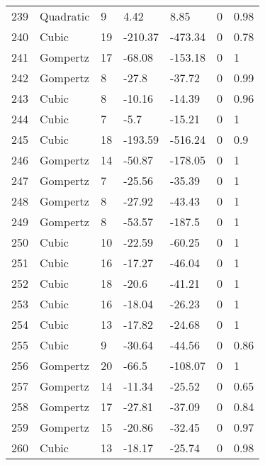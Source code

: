 \documentclass[11pt]{article}
\begin{document}
\begin{center}
\begin{longtable}{lllllll}
        239 & Quadratic & 9               & 4.42    & 8.85    & 0       & 0.98 \\
        240 & Cubic     & 19              & -210.37 & -473.34 & 0       & 0.78 \\
        241 & Gompertz  & 17              & -68.08  & -153.18 & 0       & 1    \\
        242 & Gompertz  & 8               & -27.8   & -37.72  & 0       & 0.99 \\
        243 & Cubic     & 8               & -10.16  & -14.39  & 0       & 0.96 \\
        244 & Cubic     & 7               & -5.7    & -15.21  & 0       & 1    \\
        245 & Cubic     & 18              & -193.59 & -516.24 & 0       & 0.9  \\
        246 & Gompertz  & 14              & -50.87  & -178.05 & 0       & 1    \\
        247 & Gompertz  & 7               & -25.56  & -35.39  & 0       & 1    \\
        248 & Gompertz  & 8               & -27.92  & -43.43  & 0       & 1    \\
        249 & Gompertz  & 8               & -53.57  & -187.5  & 0       & 1    \\
        250 & Cubic     & 10              & -22.59  & -60.25  & 0       & 1    \\
        251 & Cubic     & 16              & -17.27  & -46.04  & 0       & 1    \\
        252 & Cubic     & 18              & -20.6   & -41.21  & 0       & 1    \\
        253 & Cubic     & 16              & -18.04  & -26.23  & 0       & 1    \\
        254 & Cubic     & 13              & -17.82  & -24.68  & 0       & 1    \\
        255 & Cubic     & 9               & -30.64  & -44.56  & 0       & 0.86 \\
        256 & Gompertz  & 20              & -66.5   & -108.07 & 0       & 1    \\
        257 & Gompertz  & 14              & -11.34  & -25.52  & 0       & 0.65 \\
        258 & Gompertz  & 17              & -27.81  & -37.09  & 0       & 0.84 \\
        259 & Gompertz  & 15              & -20.86  & -32.45  & 0       & 0.97 \\
        260 & Cubic     & 13              & -18.17  & -25.74  & 0       & 0.98 \\

\end{longtable}
\end{center}
\end{document}
